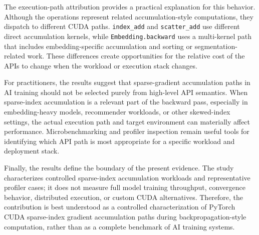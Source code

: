 The execution-path attribution provides a practical explanation for this behavior. Although the operations represent related accumulation-style computations, they dispatch to different CUDA paths. \texttt{index\_\allowbreak add} and \texttt{scatter\_\allowbreak add} use different direct accumulation kernels, while \texttt{Embedding.\allowbreak backward} uses a multi-kernel path that includes embedding-specific accumulation and sorting or segmentation-related work. These differences create opportunities for the relative cost of the APIs to change when the workload or execution stack changes.

For practitioners, the results suggest that sparse-gradient accumulation paths in AI training should not be selected purely from high-level API semantics. When sparse-index accumulation is a relevant part of the backward pass, especially in embedding-heavy models, recommender workloads, or other skewed-index settings, the actual execution path and target environment can materially affect performance. Microbenchmarking and profiler inspection remain useful tools for identifying which API path is most appropriate for a specific workload and deployment stack.

Finally, the results define the boundary of the present evidence. The study characterizes controlled sparse-index accumulation workloads and representative profiler cases; it does not measure full model training throughput, convergence behavior, distributed execution, or custom CUDA alternatives. Therefore, the contribution is best understood as a controlled characterization of PyTorch CUDA sparse-index gradient accumulation paths during backpropagation-style computation, rather than as a complete benchmark of AI training systems.
